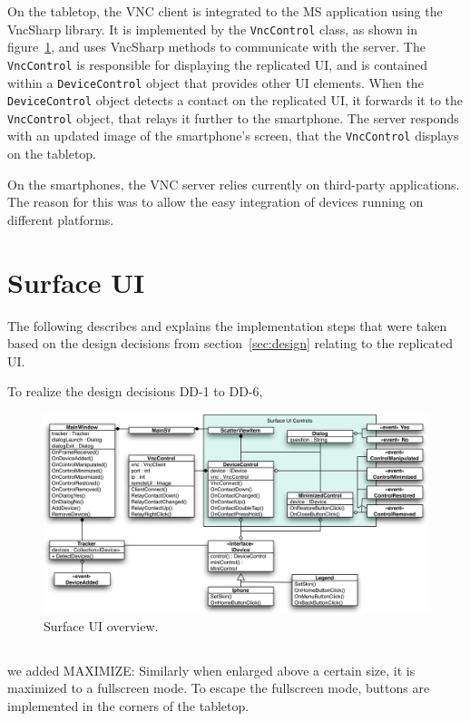 On the tabletop, the VNC client is integrated to the MS application using the VncSharp library.
It is implemented by the \texttt{VncControl} class, as shown in figure~\ref{fig:surfaceDiagram}, and uses VncSharp methods to communicate with the server.
The \texttt{VncControl} is responsible for displaying the replicated UI, and is contained within a \texttt{DeviceControl} object that provides other UI elements.
When the \texttt{DeviceControl} object detects a contact on the replicated UI, it forwards it to the \texttt{VncControl} object, that relays it further to the smartphone.
The server responds with an updated image of the smartphone's screen, that the \texttt{VncControl} displays on the tabletop.

On the smartphones, the VNC server relies currently on third-party applications.
The reason for this was to allow the easy integration of devices running on different platforms.

\section{Surface UI}
\label{sec:surfaceui}

The following describes and explains the implementation steps that were taken based on the design decisions from section~\ref{sec:design} relating to the replicated UI.

To realize the design decisions DD-1 to DD-6,

\begin{figure}[htb]
  \centering
    \includegraphics[width=1\textwidth]{images/surfaceDiagram}
    \caption{Surface UI overview.}
    \label{fig:surfaceDiagram}
\end{figure}


\subsection{}

we added MAXIMIZE:
Similarly when enlarged above a certain size, it is maximized to a fullscreen mode. To escape the fullscreen mode, buttons are implemented in the corners of the tabletop.






